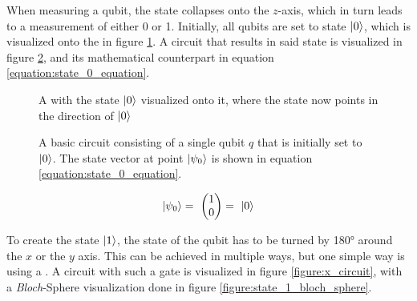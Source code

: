 When measuring a qubit, the state collapses onto the $z$-axis\cite{feynman_feynman_1965}, which in turn leads to a measurement of either 0 or 1. Initially, all qubits are set to state $\ket{0}$, which is visualized onto the \bloch in figure \ref{figure:state_0_bloch_sphere}. A circuit that results in said state is visualized in figure \ref{figure:state_0_circuit}, and its mathematical counterpart in equation \ref{equation:state_0_equation}.

\begin{figure}[!h]
    \centering
    \scalebox{\blochwidth}{
        
    }
    \caption{A \bloch with the state $\ket{0}$ visualized onto it, where the state now points in the direction of $\ket{0}$}
    \label{figure:state_0_bloch_sphere}
\end{figure}

\begin{figure}[!h]
    \centering
    \caption{A basic circuit consisting of a single qubit $q$ that is initially set to $\ket{0}$. The state vector at point $\ket{\psi_0}$ is shown in equation \ref{equation:state_0_equation}.}
    \label{figure:state_0_circuit}
\end{figure}


\begin{equation}
    \centering
    \begin{split}
        \ket{\psi_0} =\ \begin{pmatrix}1 \\ 0\end{pmatrix} =\ \ket{0}\\
    \end{split}
    \label{equation:state_0_equation}
\end{equation}

\par

To create the state $\ket{1}$, the state of the qubit has to be turned by 180° around the $x$ or the $y$ axis. This can be achieved in multiple ways, but one simple way is using a \xgate\cite{qiskit_xgate_nodate}. A circuit with such a gate is visualized in figure \ref{figure:x_circuit}, with a \emph{Bloch}-Sphere visualization done in figure \ref{figure:state_1_bloch_sphere}.

